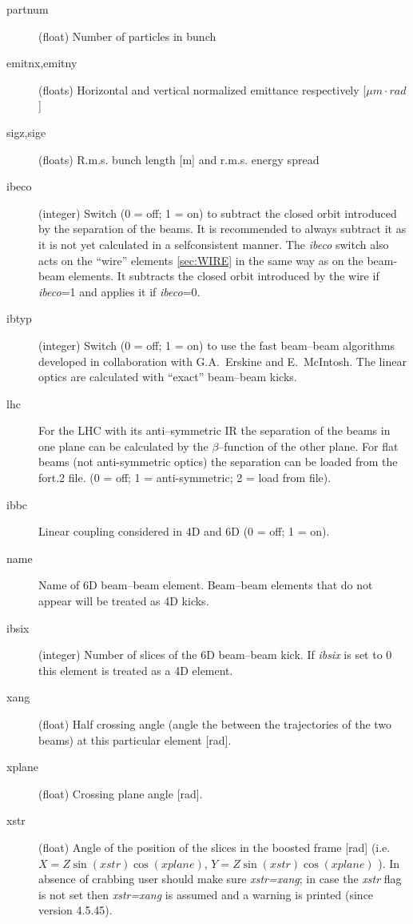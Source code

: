 \documentclass[a4paper,11pt]{report}
\begin{document}
\begin{description}
\item [partnum] (float) Number of particles in bunch
\item [emitnx,emitny] (floats) Horizontal and vertical normalized
  emittance respectively [$\mu m\cdot rad$]
\item [sigz,sige] (floats) R.m.s. bunch length [m] and r.m.s. energy
  spread
\item [ibeco] (integer) Switch (0 = off; 1 = on) to subtract the
  closed orbit introduced by the separation of the beams. It is
  recommended to always subtract it as it is not yet calculated in a
  selfconsistent manner. The \emph{ibeco} switch also acts on the ``wire'' elements \ref{sec:WIRE} in the same way as on the beam-beam elements. It subtracts the closed orbit introduced by the wire if \emph{ibeco}=1 and applies it if \emph{ibeco}=0.
\item [ibtyp] (integer) Switch (0 = off; 1 = on) to use the fast
  beam--beam algorithms developed in collaboration with G.A.~Erskine
  and E.~McIntosh.  The linear optics are calculated with ``exact''
  beam--beam kicks.
\item [lhc] For the LHC with its anti--symmetric IR the separation of
  the beams in one plane can be calculated by the $\beta$--function of
  the other plane. For flat beams (not anti-symmetric optics) the separation
  can be loaded from the fort.2 file. (0 = off; 1 = anti-symmetric; 2 = load from file).
\item [ibbc] Linear coupling considered in 4D and 6D (0 = off; 1 = on).
\item [name] Name of 6D beam--beam element. Beam--beam elements that
  do not appear will be treated as 4D kicks.
\item [ibsix] (integer) Number of slices of the 6D beam--beam kick.
  If {\it ibsix} is set to 0 this element is treated as a 4D element.
\item [xang] (float) Half crossing angle (angle the between the trajectories of the two beams) at this particular element [rad].
\item [xplane] (float) Crossing plane angle [rad].
\item [xstr] (float) Angle of the position of the slices in the boosted frame [rad] (i.e. $X = Z \sin(\mathit{xstr}) \cos(\mathit{xplane})$, $Y =Z \sin(\mathit{xstr}) \cos(\mathit{xplane})$ ).
  In absence of crabbing user should make sure \textit{xstr=xang}; in case the \textit{xstr} flag is not set then \textit{xstr=xang} is assumed and a warning is printed (since version 4.5.45).
\end{description}
\end{document}
